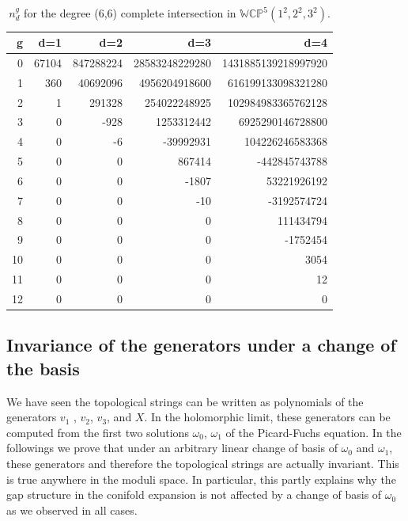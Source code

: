 \documentclass[12pt]{article}
\begin{document}
\begin{table}
\begin{centering}
\begin{tabular}{|r|rrrr|}
\hline
g &d=1 &d=2 &d=3 &d=4 \\
\hline
0&67104& 847288224& 28583248229280& 1431885139218997920 \\
1& 360& 40692096& 4956204918600& 616199133098321280\\
2& 1& 291328& 254022248925& 102984983365762128 \\
3& 0& -928& 1253312442& 6925290146728800\\
4& 0& -6& -39992931& 104226246583368\\
5& 0& 0& 867414& -442845743788\\
6&0& 0& -1807& 53221926192\\
7& 0& 0& -10& -3192574724\\
8& 0& 0& 0& 111434794\\
9& 0& 0& 0& -1752454\\
10& 0& 0& 0& 3054\\
11&0& 0& 0& 12\\
12& 0& 0& 0& 0\\
\hline
\end{tabular}
\caption{$n^g_d$ for the degree (6,6) complete intersection in $\mathbb{WCP}^5(1^2,2^2,3^2)$.}
\end{centering}
\end{table}


\newpage
\subsection{Invariance of the generators under a change of the basis}
\label{sectioninvariance}
We have seen the topological strings can be written as polynomials
of the generators $v_1$ , $v_2$, $v_3$, and $X$. In the
holomorphic limit, these generators can be computed from the first
two solutions $\omega_0$, $\omega_1$ of the Picard-Fuchs equation.
In the followings we prove that under an arbitrary linear change
of basis of $\omega_0$ and $\omega_1$, these generators and
therefore the topological strings are actually invariant. This is
true anywhere in the moduli space. In particular, this partly
explains why the gap structure in the conifold expansion is not
affected by a change of basis of $\omega_0$ as we observed in
all cases.
\end{document}
